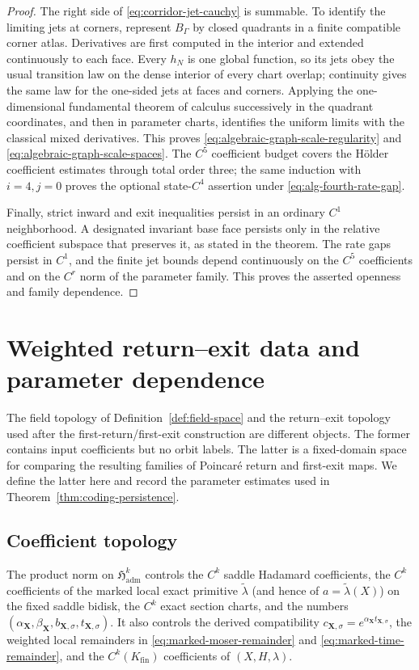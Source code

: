 \documentclass[11pt]{amsart}
\numberwithin{equation}{section}
\theoremstyle{definition}
\theoremstyle{remark}
\begin{document}
\begin{proof}
The right side of \eqref{eq:corridor-jet-cauchy} is summable.  To identify
the limiting jets at corners, represent $B_\Gamma$ by closed quadrants in
a finite compatible corner atlas.  Derivatives are first computed in the
interior and extended continuously to each face.  Every $h_N$ is one
global function, so its jets obey the usual transition law on the dense
interior of every chart overlap; continuity gives the same law for the
one-sided jets at faces and corners.  Applying the one-dimensional
fundamental theorem of calculus successively in the quadrant coordinates,
and then in parameter charts, identifies the uniform limits with the
classical mixed derivatives.  This proves
\eqref{eq:algebraic-graph-scale-regularity} and
\eqref{eq:algebraic-graph-scale-spaces}.  The $C^5$ coefficient budget
covers the H\"older coefficient estimates through total order three; the
same induction with $i=4,j=0$ proves the optional state-$C^4$ assertion
under \eqref{eq:alg-fourth-rate-gap}.

Finally, strict inward and exit inequalities persist in an ordinary
$C^1$ neighborhood.  A designated invariant base face persists only in
the relative coefficient subspace that preserves it, as stated in the
theorem.  The rate gaps persist in $C^1$, and the finite jet bounds depend
continuously on the $C^5$ coefficients and on the $C^r$ norm of the
parameter family.  This proves the asserted openness and family
dependence.
\end{proof}

\section{Weighted return--exit data and parameter dependence}
\label{app:weighted-map-space}

The field topology of Definition~\ref{def:field-space} and the return--exit
topology used after the first-return/first-exit construction are different objects.
The former contains input coefficients but no orbit labels.  The latter is a
fixed-domain space for comparing the resulting families of Poincar\'e
return and first-exit maps.  We define the latter here and record the
parameter estimates used in Theorem~\ref{thm:coding-persistence}.

\subsection{Coefficient topology}
\label{app:coefficient-topology}

The product norm on $\mathfrak H_{\mathrm{adm}}^k$ controls the $C^k$
saddle Hadamard coefficients, the $C^k$ coefficients of the marked local
exact primitive $\widetilde\lambda$ (and hence of
$a=\widetilde\lambda(X)$) on the fixed saddle bidisk, the $C^k$ exact
section charts, and the numbers
$(\alpha_{\mathbf X},\beta_{\mathbf X},b_{\mathbf X,\sigma},
t_{\mathbf X,\sigma})$.  It also controls the derived compatibility
$c_{\mathbf X,\sigma}=e^{\alpha_{\mathbf X}t_{\mathbf X,\sigma}}$, the
weighted local remainders in \eqref{eq:marked-moser-remainder} and
\eqref{eq:marked-time-remainder}, and the $C^k(K_{\mathrm{fin}})$
coefficients of $(X,H,\lambda)$.
\end{document}
